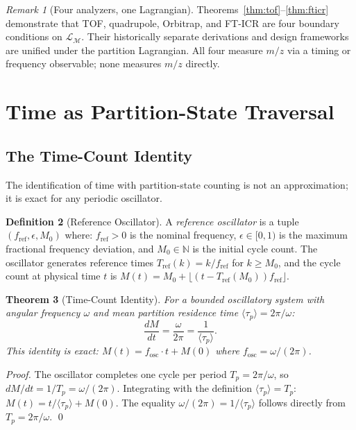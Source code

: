 \documentclass[twocolumn,10pt,a4paper]{article}
\theoremstyle{thmstyle}
\newtheorem{theorem}{Theorem}[section]
\theoremstyle{definition}
\newtheorem{definition}[theorem]{Definition}
\theoremstyle{remark}
\newtheorem{remark}[theorem]{Remark}
\newcommand{\N}{\mathbb{N}}
\newcommand{\Tref}{T_{\mathrm{ref}}}
\newcommand{\Mcyc}{M}
\newcommand{\fref}{f_{\mathrm{ref}}}
\newcommand{\LM}{\mathcal{L}_{\mathcal{M}}}
\newcommand{\tp}{\langle\tau_{p}\rangle}
\begin{document}
\begin{remark}[Four analyzers, one Lagrangian]
Theorems~\ref{thm:tof}--\ref{thm:fticr} demonstrate that TOF, quadrupole,
Orbitrap, and FT-ICR are four boundary conditions on $\LM$. Their
historically separate derivations and design frameworks are unified
under the partition Lagrangian. All four measure $m/z$ via a timing
or frequency observable; none measures $m/z$ directly.
\end{remark}

\section{Time as Partition-State Traversal}
\label{sec:timecount}

\subsection{The Time-Count Identity}

The identification of time with partition-state counting is not an
approximation; it is exact for any periodic oscillator.

\begin{definition}[Reference Oscillator]
\label{def:oscillator}
A \emph{reference oscillator} is a tuple $(\fref, \epsilon, M_0)$ where:
$\fref > 0$ is the nominal frequency,
$\epsilon \in [0,1)$ is the maximum fractional frequency deviation,
and $M_0 \in \N$ is the initial cycle count.
The oscillator generates reference times $\Tref(k) = k/\fref$ for
$k \geq M_0$, and the cycle count at physical time $t$ is
$\Mcyc(t) = M_0 + \lfloor(t - \Tref(M_0))\fref\rfloor$.
\end{definition}

\begin{theorem}[Time-Count Identity]
\label{thm:timecount}
For a bounded oscillatory system with angular frequency $\omega$ and
mean partition residence time $\tp = 2\pi/\omega$:
\begin{equation}
\frac{d\Mcyc}{dt} = \frac{\omega}{2\pi} = \frac{1}{\tp}.
\label{eq:timecount}
\end{equation}
This identity is exact: $\Mcyc(t) = f_{\mathrm{osc}} \cdot t + \Mcyc(0)$
where $f_{\mathrm{osc}} = \omega/(2\pi)$.
\end{theorem}

\begin{proof}
The oscillator completes one cycle per period $T_p = 2\pi/\omega$, so
$d\Mcyc/dt = 1/T_p = \omega/(2\pi)$. Integrating with the definition
$\tp = T_p$: $\Mcyc(t) = t/\tp + \Mcyc(0)$. The equality
$\omega/(2\pi) = 1/\tp$ follows directly from $T_p = 2\pi/\omega$. \qed
\end{proof}
\end{document}
